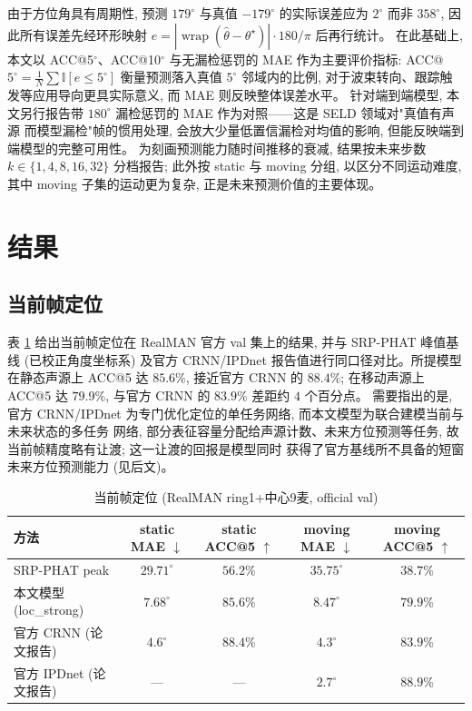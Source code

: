 \documentclass[UTF8,a4paper,11pt]{ctexart}
\newcommand{\wrap}{\operatorname{wrap}}
\begin{document}
由于方位角具有周期性, 预测 $179^\circ$ 与真值 $-179^\circ$ 的实际误差应为 $2^\circ$ 而非 $358^\circ$,
因此所有误差先经环形映射 $e=|\wrap(\hat{\theta}-\theta^\star)|\cdot 180/\pi$ 后再行统计。
在此基础上, 本文以 ACC@5$^\circ$、ACC@10$^\circ$ 与无漏检惩罚的 MAE 作为主要评价指标:
ACC@$5^\circ=\frac{1}{N}\sum\mathbb{I}[e\le 5^\circ]$ 衡量预测落入真值 $5^\circ$ 邻域内的比例,
对于波束转向、跟踪触发等应用导向更具实际意义, 而 MAE 则反映整体误差水平。
针对端到端模型, 本文另行报告带 $180^\circ$ 漏检惩罚的 MAE 作为对照——这是 SELD 领域对"真值有声源
而模型漏检"帧的惯用处理, 会放大少量低置信漏检对均值的影响, 但能反映端到端模型的完整可用性。
为刻画预测能力随时间推移的衰减, 结果按未来步数 $k\in\{1,4,8,16,32\}$ 分档报告; 此外按 static 与
moving 分组, 以区分不同运动难度, 其中 moving 子集的运动更为复杂, 正是未来预测价值的主要体现。

\section{结果}

\subsection{当前帧定位}

表 \ref{tab:current} 给出当前帧定位在 RealMAN 官方 val 集上的结果, 并与 SRP-PHAT 峰值基线
(已校正角度坐标系) 及官方 CRNN/IPDnet 报告值进行同口径对比。所提模型在静态声源上 ACC@5 达 $85.6\%$,
接近官方 CRNN 的 $88.4\%$; 在移动声源上 ACC@5 达 $79.9\%$, 与官方 CRNN 的 $83.9\%$ 差距约 $4$ 个百分点。
需要指出的是, 官方 CRNN/IPDnet 为专门优化定位的单任务网络, 而本文模型为联合建模当前与未来状态的多任务
网络, 部分表征容量分配给声源计数、未来方位预测等任务, 故当前帧精度略有让渡; 这一让渡的回报是模型同时
获得了官方基线所不具备的短窗未来方位预测能力 (见后文)。

\begin{table}[h]
  \centering
  \caption{当前帧定位 (RealMAN ring1+中心9麦, official val)}
  \label{tab:current}
  \begin{tabular}{lcccc}
    \toprule
    方法 & static MAE $\downarrow$ & static ACC@5 $\uparrow$ & moving MAE $\downarrow$ & moving ACC@5 $\uparrow$ \\
    \midrule
    SRP-PHAT peak & $29.71^\circ$ & $56.2\%$ & $35.75^\circ$ & $38.7\%$ \\
    本文模型 (loc\_strong) & $\mathbf{7.68^\circ}$ & $\mathbf{85.6\%}$ & $\mathbf{8.47^\circ}$ & $\mathbf{79.9\%}$ \\
    官方 CRNN (论文报告) & $4.6^\circ$ & $88.4\%$ & $4.3^\circ$ & $83.9\%$ \\
    官方 IPDnet (论文报告) & --- & --- & $2.7^\circ$ & $88.9\%$ \\
    \bottomrule
  \end{tabular}
\end{table}
\end{document}
